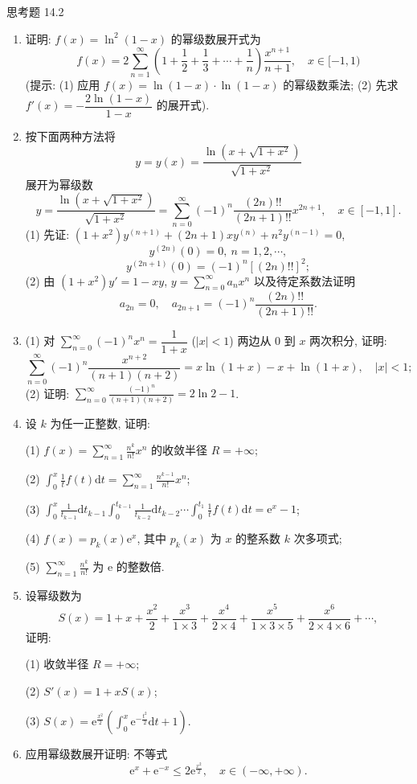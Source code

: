 \begin{exblock}{思考题 14.2}
\begin{enumerate}
  \item 证明: $f(x)=\ln^{2}(1-x)$ 的幂级数展开式为
  \[
    f(x)=2\sum_{n=1}^{\infty}\left(1+\frac{1}{2}+\frac{1}{3}+\cdots+\frac{1}{n}\right)\frac{x^{n+1}}{n+1},\quad x\in[-1,1)
\]
  (提示: (1) 应用 $f(x)=\ln(1-x)\cdot\ln(1-x)$ 的幂级数乘法; (2) 先求 $f'(x)=-\dfrac{2\ln(1-x)}{1-x}$ 的展开式).
  \item 按下面两种方法将
  \[
    y=y(x)=\frac{\ln(x+\sqrt{1+x^{2}})}{\sqrt{1+x^{2}}}
\]
  展开为幂级数
  \[
    y=\frac{\ln(x+\sqrt{1+x^{2}})}{\sqrt{1+x^{2}}}=\sum_{n=0}^{\infty}(-1)^{n}\frac{(2n)!!}{(2n+1)!!}x^{2n+1},\quad x\in[-1,1].
\]
  (1) 先证: $(1+x^{2})y^{(n+1)}+(2n+1)xy^{(n)}+n^{2}y^{(n-1)}=0$,
  \[
    y^{(2n)}(0)=0,\ n=1,2,\cdots,
\]
  \[
    y^{(2n+1)}(0)=(-1)^{n}[(2n)!!]^{2};
\]
  (2) 由 $(1+x^{2})y'=1-xy$, $y=\sum_{n=0}^{\infty}a_{n}x^{n}$ 以及待定系数法证明
  \[
    a_{2n}=0,\quad a_{2n+1}=(-1)^{n}\frac{(2n)!!}{(2n+1)!!}.
\]
  \item (1) 对 $\sum_{n=0}^{\infty}(-1)^{n}x^{n}=\dfrac{1}{1+x}$ ($|x|<1$) 两边从 $0$ 到 $x$ 两次积分, 证明:
  \[
    \sum_{n=0}^{\infty}(-1)^{n}\frac{x^{n+2}}{(n+1)(n+2)}=x\ln(1+x)-x+\ln(1+x),\quad|x|<1;
\]
  (2) 证明: $\displaystyle\sum_{n=0}^{\infty}\frac{(-1)^{n}}{(n+1)(n+2)}=2\ln2-1$.
  \item 设 $k$ 为任一正整数, 证明:

  (1) $f(x)=\displaystyle\sum_{n=1}^{\infty}\frac{n^{k}}{n!}x^{n}$ 的收敛半径 $R=+\infty$;

  (2) $\displaystyle\int_{0}^{x}\frac{1}{t}f(t)\mathrm{d}t=\sum_{n=1}^{\infty}\frac{n^{k-1}}{n!}x^{n}$;

  (3) $\displaystyle\int_{0}^{x}\frac{1}{t_{k-1}}\mathrm{d}t_{k-1}\int_{0}^{t_{k-1}}\frac{1}{t_{k-2}}\mathrm{d}t_{k-2}\cdots\int_{0}^{t_{1}}\frac{1}{t}f(t)\mathrm{d}t=\mathrm{e}^{x}-1$;

  (4) $f(x)=p_{k}(x)\mathrm{e}^{x}$, 其中 $p_{k}(x)$ 为 $x$ 的整系数 $k$ 次多项式;

  (5) $\displaystyle\sum_{n=1}^{\infty}\frac{n^{k}}{n!}$ 为 $\mathrm{e}$ 的整数倍.
  \item 设幂级数为
  \[
    S(x)=1+x+\frac{x^{2}}{2}+\frac{x^{3}}{1\times3}+\frac{x^{4}}{2\times4}+\frac{x^{5}}{1\times3\times5}+\frac{x^{6}}{2\times4\times6}+\cdots,
\]
  证明:

  (1) 收敛半径 $R=+\infty$;

  (2) $S'(x)=1+xS(x)$;

  (3) $S(x)=\mathrm{e}^{\frac{x^{2}}{2}}\left(\int_{0}^{x}\mathrm{e}^{-\frac{t^{2}}{2}}\mathrm{d}t+1\right)$.
  \item 应用幂级数展开证明: 不等式
  \[
    \mathrm{e}^{x}+\mathrm{e}^{-x}\leqslant2\mathrm{e}^{\frac{x^{2}}{2}},\quad x\in(-\infty,+\infty).
\]
\end{enumerate}
\end{exblock}

